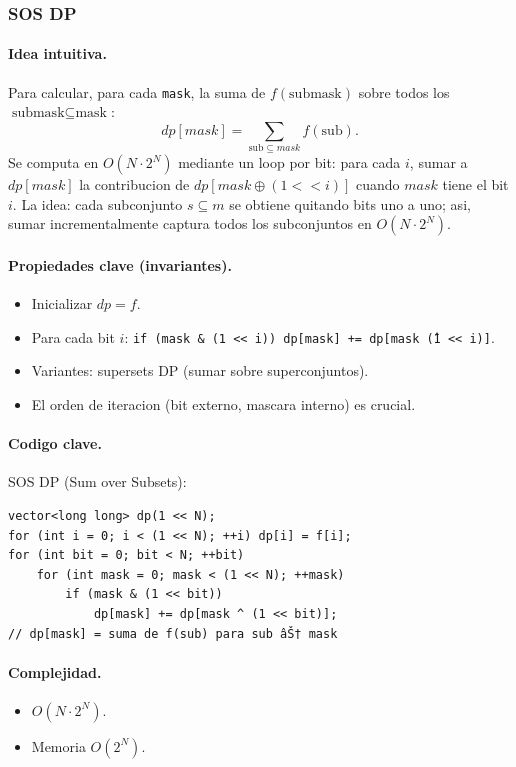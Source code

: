 ﻿\subsubsection{SOS DP}

\paragraph{Idea intuitiva.}
Para calcular, para cada \texttt{mask}, la suma de $f(\text{submask})$ sobre todos los $\text{submask} \subseteq \text{mask}$:
\[ dp[mask] = \sum_{\text{sub} \subseteq mask} f(\text{sub}). \]
Se computa en $O(N \cdot 2^N)$ mediante un loop por bit: para cada $i$, sumar a $dp[mask]$ la contribucion de $dp[mask \oplus (1 << i)]$ cuando $mask$ tiene el bit $i$. La idea: cada subconjunto $s \subseteq m$ se obtiene quitando bits uno a uno; asi, sumar incrementalmente captura todos los subconjuntos en $O(N \cdot 2^N)$.

\paragraph{Propiedades clave (invariantes).}
\begin{itemize}\setlength\itemsep{0pt}
	\item Inicializar $dp = f$.
	\item Para cada bit $i$: \texttt{if (mask \& (1 << i)) dp[mask] += dp[mask \^ (1 << i)]}.
	\item Variantes: supersets DP (sumar sobre superconjuntos).
	\item El orden de iteracion (bit externo, mascara interno) es crucial.
\end{itemize}

\paragraph{Codigo clave.}
SOS DP (Sum over Subsets):
\begin{verbatim}
vector<long long> dp(1 << N);
for (int i = 0; i < (1 << N); ++i) dp[i] = f[i];
for (int bit = 0; bit < N; ++bit)
    for (int mask = 0; mask < (1 << N); ++mask)
        if (mask & (1 << bit))
            dp[mask] += dp[mask ^ (1 << bit)];
// dp[mask] = suma de f(sub) para sub âŠ† mask
\end{verbatim}

\paragraph{Complejidad.}
\begin{itemize}\setlength\itemsep{0pt}
	\item $O(N \cdot 2^N)$.
	\item Memoria $O(2^N)$.
\end{itemize}

